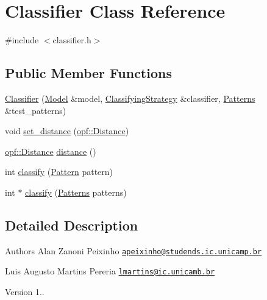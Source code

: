 \hypertarget{classClassifier}{\section{Classifier Class Reference}
\label{classClassifier}
}


{\ttfamily \#include $<$classifier.\+h$>$}

\subsection*{Public Member Functions}
\begin{DoxyCompactItemize}
\item 
\hyperlink{classClassifier_ab386c7969106735b11062f948eb16708}{Classifier} (\hyperlink{classModel}{Model} \&model, \hyperlink{classClassifyingStrategy}{Classifying\+Strategy} \&classifier, \hyperlink{classPatterns}{Patterns} \&test\+\_\+patterns)
\item 
void \hyperlink{classClassifier_a7665a5d4968c83f5e02829b67e5c7c3b}{set\+\_\+distance} (\hyperlink{namespaceopf_a61631393754e0aa6aaeacf0767b2b419}{opf\+::\+Distance})
\item 
\hyperlink{namespaceopf_a61631393754e0aa6aaeacf0767b2b419}{opf\+::\+Distance} \hyperlink{classClassifier_a626488d8dea91e51687de45681fbbddd}{distance} ()
\item 
int \hyperlink{classClassifier_a955fe3a8a866ae5ad0d322077967cbfe}{classify} (\hyperlink{classPattern}{Pattern} pattern)
\item 
int $\ast$ \hyperlink{classClassifier_a3e1ed6cb802dd01c2f9485daf2d1e023}{classify} (\hyperlink{classPatterns}{Patterns} patterns)
\end{DoxyCompactItemize}


\subsection{Detailed Description}
\begin{DoxyAuthor}{Authors}
Alan Zanoni Peixinho \href{mailto:apeixinho@studends.ic.unicamp.br}{\tt apeixinho@studends.\+ic.\+unicamp.\+br} 

Luis Augusto Martins Pereria \href{mailto:lmartins@ic.unicamb.br}{\tt lmartins@ic.\+unicamb.\+br} 
\end{DoxyAuthor}
\begin{DoxyVersion}{Version}
1.. 
\end{DoxyVersion}


